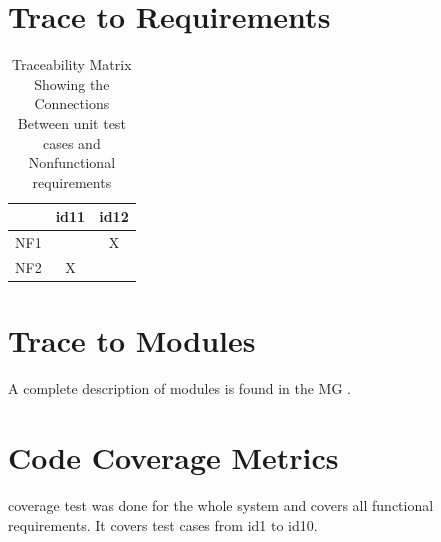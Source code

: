 \documentclass[12pt, titlepage]{article}
\begin{document}
\section{Trace to Requirements}\label{functional}

\begin{table}[h!]
\centering
{}
\caption{Traceability Matrix Showing the Connections Between unit test cases and functional requirements}
\label{Table:R_trace}
\end{table}

\begin{table}[h!]
\centering
\begin{tabular}{|c|c|c|}
\hline
  & id11 & id12   \\
\hline
NF1  & & X \\ \hline
NF2  & X& \\ \hline
\hline
\end{tabular}
\caption{Traceability Matrix Showing the Connections Between unit test cases and Nonfunctional requirements}
\label{Table:R_trace1}
\end{table}

\section{Trace to Modules}	
	
A complete description of modules is found in the MG \cite{Designdocument}.
\begin{table}[h!]
\centering
{}
\caption{Traceability Matrix Showing the Connections Between Modules and Test Cases}
\label{Table:R_trace2}
\end{table}

\section{Code Coverage Metrics}

coverage test was done for the whole system and covers all functional requirements. It covers test cases from id1 to id10. 

\newpage



\end{document}

